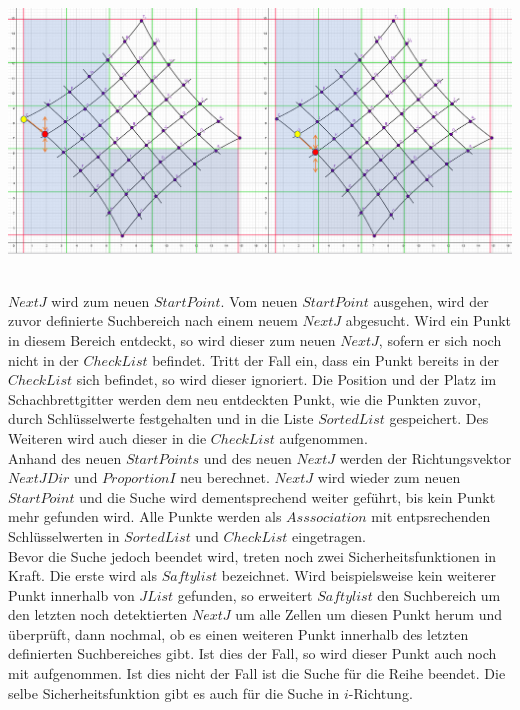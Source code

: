 \begin{minipage}{\linewidth}
	\centering
	\includegraphics[width=1\linewidth]{images/VerzeichnetesSchachbrett_4.png}
	\label{fig:IListJList}
\end{minipage}\\

$NextJ$ wird zum neuen $StartPoint$. Vom neuen $StartPoint$ ausgehen, wird der zuvor definierte Suchbereich nach einem neuem $NextJ$ abgesucht. Wird ein Punkt in diesem Bereich entdeckt, so wird dieser zum neuen $NextJ$, sofern er sich noch nicht in der $CheckList$ befindet. Tritt der Fall ein, dass ein Punkt bereits in der $CheckList$ sich befindet, so wird dieser ignoriert. Die Position und der Platz im Schachbrettgitter werden dem neu entdeckten Punkt, wie die Punkten zuvor, durch Schlüsselwerte festgehalten und in die Liste $SortedList$ gespeichert. Des Weiteren wird auch dieser in die $CheckList$ aufgenommen.\\

Anhand des neuen $StartPoints$ und des neuen $NextJ$ werden der Richtungsvektor $NextJDir$ und $ProportionI$ neu berechnet. $NextJ$ wird wieder zum neuen $StartPoint$ und die Suche wird dementsprechend weiter geführt, bis kein Punkt mehr gefunden wird. Alle Punkte werden als $Asssociation$ mit entpsrechenden Schlüsselwerten in $SortedList$ und $CheckList$ eingetragen.\\

Bevor die Suche jedoch beendet wird, treten noch zwei Sicherheitsfunktionen in Kraft. Die erste wird als $Saftylist$ bezeichnet. Wird beispielsweise kein weiterer Punkt innerhalb von $JList$ gefunden, so erweitert $Saftylist$ den Suchbereich um den letzten noch detektierten $NextJ$ um alle Zellen um diesen Punkt herum und überprüft, dann nochmal, ob es einen weiteren Punkt innerhalb des letzten definierten Suchbereiches gibt. Ist dies der Fall, so wird dieser Punkt auch noch mit aufgenommen. Ist dies nicht der Fall ist die Suche für die Reihe beendet. Die selbe Sicherheitsfunktion gibt es auch für die Suche in $i$-Richtung.\\

